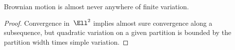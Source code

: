 \begin	{corollary}
Brownian motion is almost never anywhere of finite variation.
\end	{corollary}
\begin	{proof}
Convergence in~$\Ell^2$ implies almost sure convergence along a subsequence,
but quadratic variation on a given partition
is bounded by the partition width times simple variation.
\end	{proof}

